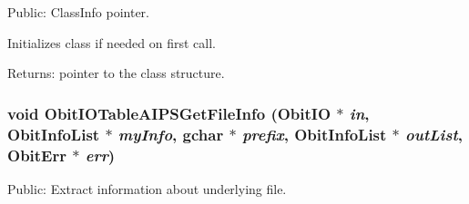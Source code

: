 Public: Class\-Info pointer. 

Initializes class if needed on first call. \begin{Desc}
\item[Returns:]pointer to the class structure. \end{Desc}
\subsubsection{\setlength{\rightskip}{0pt plus 5cm}void Obit\-IOTable\-AIPSGet\-File\-Info ({\bf Obit\-IO} $\ast$ {\em in}, {\bf Obit\-Info\-List} $\ast$ {\em my\-Info}, gchar $\ast$ {\em prefix}, {\bf Obit\-Info\-List} $\ast$ {\em out\-List}, {\bf Obit\-Err} $\ast$ {\em err})}\label{ObitIOTableAIPS_8h_a20}


Public: Extract information about underlying file. 

